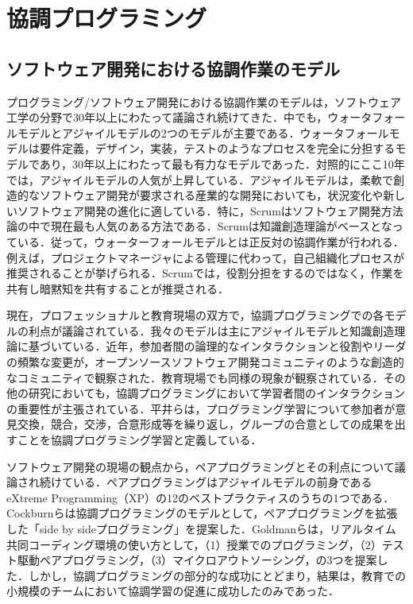 \chapter{協調プログラミング}\label{Def}


\section{ソフトウェア開発における協調作業のモデル}

プログラミング/ソフトウェア開発における協調作業のモデルは，ソフトウェア工学の分野で30年以上にわたって議論され続けてきた．中でも，ウォータフォールモデルとアジャイルモデルの2つのモデルが主要である．ウォータフォールモデルは要件定義，デザイン，実装，テストのようなプロセスを完全に分担するモデルであり，30年以上にわたって最も有力なモデルであった．対照的にここ10年では，アジャイルモデルの人気が上昇している．アジャイルモデルは，柔軟で創造的なソフトウェア開発が要求される産業的な開発においても，状況変化や新しいソフトウェア開発の進化に適している．特に，Scrum\cite{schwaber2002gile}はソフトウェア開発方法論の中で現在最も人気のある方法である．Scrumは知識創造理論\cite{takeuchi1986new}がベースとなっている．従って，ウォーターフォールモデルとは正反対の協調作業が行われる．例えば，プロジェクトマネージャによる管理に代わって，自己組織化プロセスが推奨されることが挙げられる．Scrumでは，役割分担をするのではなく，作業を共有し暗黙知を共有することが推奨される．

現在，プロフェッショナルと教育現場の双方で，協調プログラミングでの各モデルの利点が議論されている．我々のモデルは主にアジャイルモデルと知識創造理論に基づいている．近年，参加者間の論理的なインタラクションと役割やリーダの頻繁な変更が，オープンソースソフトウェア開発コミュニティのような創造的なコミュニティで観察された\cite{kidane2007correlating}．教育現場でも同様の現象が観察されている\cite{knutas2013communication}．その他の研究においても，協調プログラミングにおいて学習者間のインタラクションの重要性が主張されている．平井らは，プログラミング学習について参加者が意見交換，競合，交渉，合意形成等を繰り返し，グループの合意としての成果を出すことを協調プログラミング学習と定義している\cite{平井佑樹2012}．

ソフトウェア開発の現場の観点から，ペアプログラミングとその利点について議論され続けている．ペアプログラミングはアジャイルモデルの前身であるeXtreme Programming（XP）\cite{beck2000extreme}の12のベストプラクティスのうちの1つである．Cockburnらは協調プログラミングのモデルとして，ペアプログラミングを拡張した「side by sideプログラミング」を提案した\cite{cockburn2000costs}．Goldmanらは，リアルタイム共同コーディング環境の使い方として，（1）授業でのプログラミング，（2）テスト駆動ペアプログラミング，（3）マイクロアウトソーシング，の3つを提案した\cite{goldman2011real}．しかし，協調プログラミングの部分的な成功にとどまり，結果は，教育での小規模のチームにおいて協調学習の促進に成功したのみであった．


